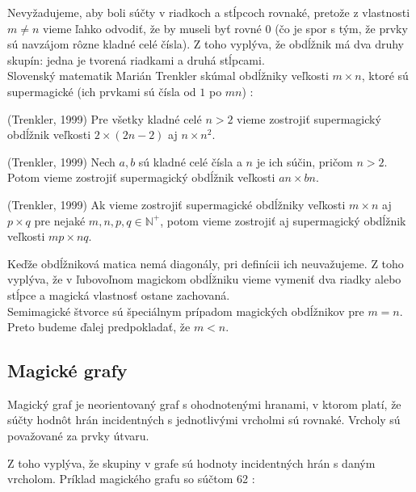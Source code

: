 Nevyžadujeme, aby boli súčty v riadkoch a stĺpcoch rovnaké, pretože z vlastnosti $m \neq n$ vieme ľahko odvodiť, že by museli byť rovné $0$ (čo je spor s tým, že prvky sú navzájom rôzne kladné celé čísla). Z toho vyplýva, že obdĺžnik má dva druhy skupín: jedna je tvorená riadkami a druhá stĺpcami. \\

Slovenský matematik Marián Trenkler skúmal obdĺžniky veľkosti $m \times n$, ktoré sú supermagické (ich prvkami sú čísla od $1$ po $mn$) \cite{rectangles}:

\begin{theorem} (Trenkler, 1999) Pre všetky kladné celé $n > 2$ vieme zostrojiť supermagický obdĺžnik veľkosti $2 \times (2n - 2)$ aj $n \times n^2$.
\end{theorem}

\begin{theorem} (Trenkler, 1999) Nech $a,b$ sú kladné celé čísla a $n$ je ich súčin, pričom $n > 2$. Potom vieme zostrojiť supermagický obdĺžnik veľkosti $an \times bn$.
\end{theorem}

\begin{theorem} (Trenkler, 1999) Ak vieme zostrojiť supermagické obdĺžniky veľkosti $m \times n$ aj $p \times q$ pre nejaké $m,n,p,q \in \mathbb{N^+}$, potom vieme zostrojiť aj supermagický obdĺžnik veľkosti $mp \times nq$.
\end{theorem}

Keďže obdĺžniková matica nemá diagonály, pri definícii ich neuvažujeme. Z toho vyplýva, že v ľubovoľnom magickom obdĺžniku vieme vymeniť dva riadky alebo stĺpce a magická vlastnosť ostane zachovaná. \\

Semimagické štvorce sú špeciálnym prípadom magických obdĺžnikov pre $m = n$. Preto budeme ďalej predpokladať, že $m < n$.

\subsection{Magické grafy}
\begin{definition} Magický graf je neorientovaný graf s ohodnotenými hranami, v ktorom platí, že súčty hodnôt hrán incidentných s jednotlivými vrcholmi sú rovnaké. Vrcholy sú považované za prvky útvaru.
\end{definition}

Z toho vyplýva, že skupiny v grafe sú hodnoty incidentných hrán s daným vrcholom. Príklad magického grafu so súčtom 62 \cite{antimagic}:


